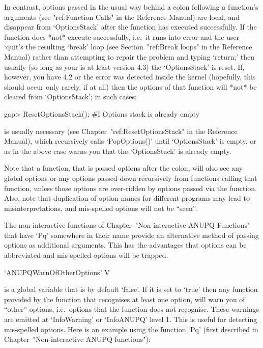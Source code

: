 In contrast, options passed in the usual way behind a colon  following  a
function's arguments (see "ref:Function Calls" in  the  {\GAP}  Reference
Manual) are local, and disappear from `OptionsStack' after  the  function
has  executed  successfully.  If  the   function   does   *not*   execute
successfully, i.e.~it runs into error and the user `quit's the  resulting
`break' loop (see Section~"ref:Break  loops"  in  the  Reference  Manual)
rather than attempting to repair the problem and  typing  `return;'  then
usually  (so  long  as  your  {\GAP}  is  at  least  version   4.3)   the
`OptionsStack' is reset. If, however, you have {\GAP} 4.2  or  the  error
was detected inside the kernel (hopefully, this should occur only rarely,
if at all) then the options of that function will *not* be  cleared  from
`OptionsStack'; in such cases:

\beginexample
gap> ResetOptionsStack();
#I  Options stack is already empty
\endexample

is usually necessary (see Chapter~"ref:ResetOptionsStack" in  the  {\GAP}
Reference  Manual),  which   recursively   calls   `PopOptions()'   until
`OptionsStack' is empty, or as in the  above  case  warns  you  that  the
`OptionsStack' is already empty.

Note that a function, that is passed options after the colon,  will  also
see any global options  or  any  options  passed  down  recursively  from
functions calling that function, unless those options are over-ridden  by
options passed via the function. Also, note that  duplication  of  option
names  for  different  programs  may  lead  to  misinterpretations,   and
mis-spelled options will not be ``seen''.

The   non-interactive   functions   of   Chapter~"Non-interactive   ANUPQ
Functions" that have `Pq' somewhere in their name provide an  alternative
method  of  passing  options  as  additional  arguments.  This  has   the
advantages that options can be abbreviated and mis-spelled  options  will
be trapped.

\>`ANUPQWarnOfOtherOptions' V

is a global variable that is by default `false'. If it is set  to  `true'
then any function provided by the {\ANUPQ} function  that  recognises  at
least one option, will warn you of ``other'' options,  i.e.~options  that
the  function  does  not  recognise.  These  warnings  are   emitted   at
`InfoWarning' or `InfoANUPQ'  level  1.  This  is  useful  for  detecting
mis-spelled options. Here is an example using the  function  `Pq'  (first
described in Chapter~"Non-interactive ANUPQ functions"):

